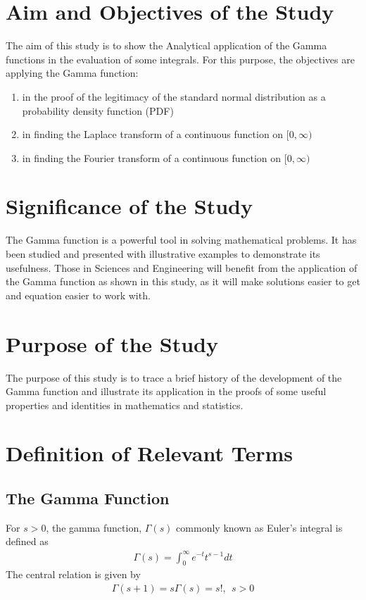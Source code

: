 \documentclass[11pt]{report}
\newcommand{\dsp}{\displaystyle}
\renewcommand{\labelenumi}{\roman{enumi}.}
\begin{document}
	\section{Aim and Objectives of the Study}
	The aim of this study is to show the Analytical application of the Gamma functions in the evaluation of some integrals. For this purpose, the objectives are applying the Gamma function:
	\begin{enumerate}
		\renewcommand{\labelenumi}{\roman{enumi})}
		\item in the proof of the legitimacy of the standard normal distribution as a probability density function (PDF)
		
		\item in finding the Laplace transform of a continuous function on $[0,\infty)$
		
		\item in finding the Fourier transform of a continuous function on $[0,\infty)$
	\end{enumerate}
	
	\section{Significance of the Study}
	The Gamma function is a powerful tool in solving mathematical problems. It has been studied and presented with illustrative examples to demonstrate its usefulness. Those in Sciences and Engineering will benefit from the application of the Gamma function as shown in this study, as it will make solutions easier to get and equation easier to work with.
	
	\section{Purpose of the Study}
	The purpose of this study is to trace a brief history of the development of the Gamma function and illustrate its application in the proofs of some useful properties and identities in mathematics and statistics.
	
	\section{Definition of Relevant Terms}
	\subsection{The Gamma Function}
	For $s>0$, the gamma function, $\dsp \Gamma(s)$ commonly known as Euler's integral is defined as
	\begin{eqnarray}
		\Gamma(s) = \int_0^\infty e^{-t}t^{s-1}dt\label{eq:1_1}
	\end{eqnarray}
	The central relation is given by
	\begin{eqnarray}
		\Gamma(s+1) = s\Gamma(s) = s!,~~ s>0 \label{eq:1_2}
	\end{eqnarray}
	
\end{document}
